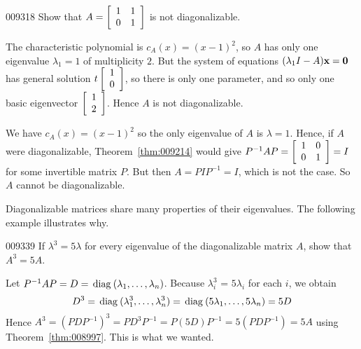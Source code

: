 \begin{example}{}{009318}
Show that $A = \left[ \begin{array}{rr}
1 & 1 \\
0 & 1 
\end{array}\right]$
 is not diagonalizable.


\begin{solution}[1] 
  The characteristic polynomial is $c_{A}(x) = (x - 1)^{2}$, so $A$ has only one eigenvalue $\lambda_{1} = 1$ of multiplicity $2$. But the system of equations $(\lambda_{1}I - A)\textbf{x} = \textbf{0}$ has general solution $ t \left[ \begin{array}{r}
1 \\ 
0
\end{array}\right]$,
 so there is only one parameter, and so only one basic eigenvector $ \left[ \begin{array}{r}
1 \\ 
2
\end{array}\right]$.
 Hence $A$ is not diagonalizable.
\end{solution}

\begin{solution}[2]
  We have $c_{A}(x) = (x - 1)^{2}$ so the only eigenvalue of $A$ is $\lambda = 1$. Hence, if $A$ were diagonalizable, Theorem~\ref{thm:009214} would give $ P^{-1}AP = \left[ \begin{array}{rr}
1 & 0 \\
0 & 1 \end{array}\right] = I$
 for some invertible matrix $P$. But then $A = PIP^{-1} = I$, which is not the case. So $A$ cannot be diagonalizable.
\end{solution}
\end{example}

Diagonalizable matrices share many properties of their eigenvalues. The following example illustrates why.


\begin{example}{}{009339}
If $\lambda^{3} = 5\lambda$ for every eigenvalue of the diagonalizable matrix $A$, show that $A^{3} = 5A$.


\begin{solution}
  Let $P^{-1}AP = D = \thinspace\operatorname{diag\medspace}(\lambda_{1}, \dots , \lambda_{n})$. Because $\lambda_i^3$ = $5\lambda_{i}$ for each $i$, we obtain
\begin{equation*}
D^3 = \thinspace\operatorname{diag\medspace}(\lambda_1^3 ,\dots, \lambda_n^3) = \thinspace\operatorname{diag\medspace}(5\lambda_1, \dots, 5 \lambda_n) = 5D
\end{equation*}
Hence $A^{3} = (PDP^{-1})^{3} = PD^{3}P^{-1} = P(5D)P^{-1} = 5(PDP^{-1}) = 5A$ using Theorem~\ref{thm:008997}. This is what we wanted.
\end{solution}
\end{example}

